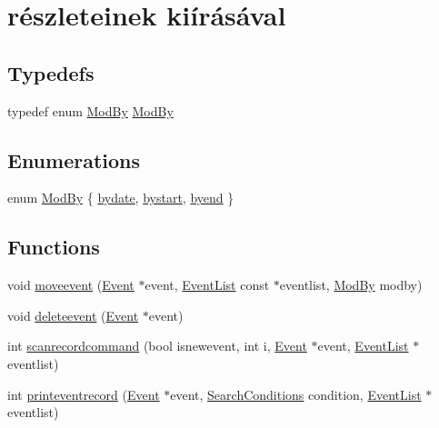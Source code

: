 \hypertarget{group___esem_xC3_xA9nyek}{}\section{részleteinek kiírásával}
\label{group___esem_xC3_xA9nyek}
\subsection*{Typedefs}
\begin{DoxyCompactItemize}
\item 
typedef enum \hyperlink{group___esem_xC3_xA9nyek_ga643f8b09cbc45afc4ad36b27c077b1fd}{Mod\+By} \hyperlink{group___esem_xC3_xA9nyek_ga362ee478a7a01737cf42d32360eda02e}{Mod\+By}
\end{DoxyCompactItemize}
\subsection*{Enumerations}
\begin{DoxyCompactItemize}
\item 
enum \hyperlink{group___esem_xC3_xA9nyek_ga643f8b09cbc45afc4ad36b27c077b1fd}{Mod\+By} \{ \hyperlink{group___esem_xC3_xA9nyek_gga643f8b09cbc45afc4ad36b27c077b1fdaa9de7918fcb113fa90f19d4b2d4d9145}{bydate}, 
\hyperlink{group___esem_xC3_xA9nyek_gga643f8b09cbc45afc4ad36b27c077b1fdafdfbfec88cf0d73c65e444460a06ea52}{bystart}, 
\hyperlink{group___esem_xC3_xA9nyek_gga643f8b09cbc45afc4ad36b27c077b1fdabf00156964562a454e20d189035c3cb3}{byend}
 \}
\end{DoxyCompactItemize}
\subsection*{Functions}
\begin{DoxyCompactItemize}
\item 
void \hyperlink{group___esem_xC3_xA9nyek_ga610dc34a1e251a16311ca7ac15f64e05}{moveevent} (\hyperlink{struct_event}{Event} $\ast$event, \hyperlink{struct_event_list}{Event\+List} const $\ast$eventlist, \hyperlink{group___esem_xC3_xA9nyek_ga643f8b09cbc45afc4ad36b27c077b1fd}{Mod\+By} modby)
\item 
void \hyperlink{group___esem_xC3_xA9nyek_gaf69a5ee77b139263897d5e6bfe7d7f2a}{deleteevent} (\hyperlink{struct_event}{Event} $\ast$event)
\item 
int \hyperlink{group___esem_xC3_xA9nyek_ga9b64fb7501bab380e6146ef4a4f558c7}{scanrecordcommand} (bool isnewevent, int i, \hyperlink{struct_event}{Event} $\ast$event, \hyperlink{struct_event_list}{Event\+List} $\ast$eventlist)
\item 
int \hyperlink{group___esem_xC3_xA9nyek_ga43a7dc247171d596d8d808776d8d40f5}{printeventrecord} (\hyperlink{struct_event}{Event} $\ast$event, \hyperlink{struct_search_conditions}{Search\+Conditions} condition, \hyperlink{struct_event_list}{Event\+List} $\ast$eventlist)
\end{DoxyCompactItemize}


